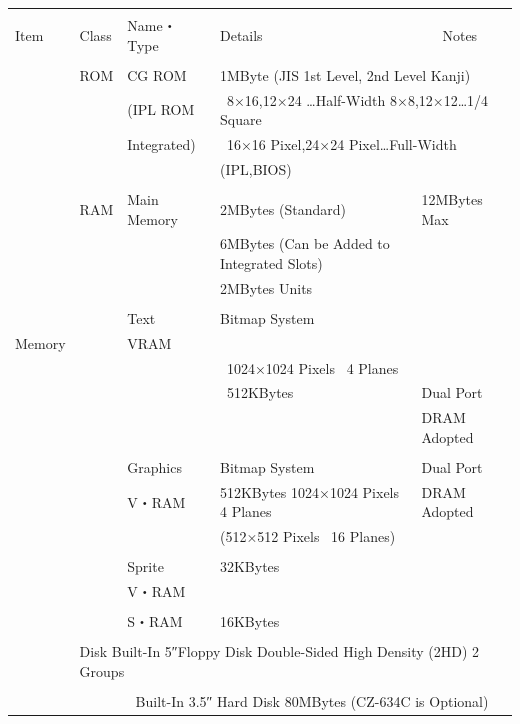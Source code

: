 \documentclass[twoside,a4paper,12pt]{article}
\begin{document}
\setlength{\tabcolsep}{0.5mm}
\begin{tabular}{|p{17mm}|p{13mm}|p{23mm}|p{80mm}|p{30mm}|}
\hline
& & & &\\[-2mm]
Item & Class & Name・Type & Details & \ \ \ Notes\\[1mm]
\hline
& & & \multicolumn{2}{l|}{}\\[-3mm]
& ROM & CG ROM & \multicolumn{2}{l|}{1MByte (JIS 1st Level, 2nd Level Kanji)}\\
& & (IPL ROM & \multicolumn{2}{l|}{\ 8×16,12×24 …Half-Width 8×8,12×12…1/4 Square}\\
& & Integrated) & \multicolumn{2}{l|}{\ 16×16 Pixel,24×24 Pixel…Full-Width}\\
& & & \multicolumn{2}{l|}{(IPL,BIOS)}\\
\cline{2-5}
& & & &\\[-3mm]
& RAM & Main Memory & 2MBytes (Standard) & 12MBytes Max\\
& & & 6MBytes (Can be Added to Integrated Slots) &\\
& & & 2MBytes Units &\\
\cline{3-5}
& & & &\\[-3mm]
& & Text & Bitmap System &\\
Memory & & VRAM & &\\
& & & \ 1024×1024 Pixels \ 4 Planes &\\
& & & \ 512KBytes & Dual Port\\
& & & & DRAM Adopted\\
\cline{3-5}
& & & &\\[-3mm]
& & Graphics & Bitmap System & Dual Port\\
& & V・RAM & 512KBytes 1024×1024 Pixels 4 Planes & DRAM Adopted\\
& & & (512×512 Pixels \ 16 Planes) &\\
\cline{3-5}
& & & \multicolumn{2}{l|}{}\\[-3mm]
& & Sprite & \multicolumn{2}{l|}{32KBytes}\\
& & V・RAM & \multicolumn{2}{l|}{}\\
\cline{3-5}
& & & \multicolumn{2}{l|}{}\\[-3mm]
& & S・RAM & \multicolumn{2}{l|}{16KBytes}\\
\hline
& \multicolumn{4}{l|}{}\\[-3mm]
& \multicolumn{4}{l|}{Disk Built-In 5″Floppy Disk Double-Sided High Density (2HD) 2 Groups}\\
& \multicolumn{4}{l|}{}\\
& \multicolumn{4}{l|}{\ \ \ \ \ \ \ \ Built-In 3.5″ Hard Disk 80MBytes (CZ-634C is Optional)}\\

\end{tabular}
\end{document}
